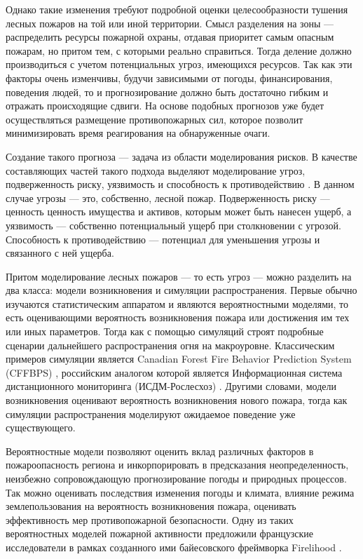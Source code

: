 \documentclass[a4paper,article,14pt]{extarticle}
\begin{document}
Однако такие изменения требуют подробной оценки целесообразности тушения лесных пожаров на той или иной территории. Смысл разделения на зоны — распределить ресурсы пожарной охраны, отдавая приоритет самым опасным пожарам, но притом тем, с которыми реально справиться. Тогда деление должно производиться с учетом потенциальных угроз, имеющихся ресурсов. Так как эти факторы очень изменчивы, будучи зависимыми от погоды, финансирования, поведения людей, то и прогнозирование должно быть достаточно гибким и отражать происходящие сдвиги. На основе подобных прогнозов уже будет осуществляться размещение противопожарных сил, которое позволит минимизировать время реагирования на обнаруженные очаги.

Создание такого прогноза — задача из области моделирования рисков. В качестве составляющих частей такого подхода выделяют моделирование угроз,  подверженность риску, уязвимость и способность к противодействию \cite{OliveiraWildfireRiskModeling2021}. В данном случае угрозы — это, собственно, лесной пожар. Подверженность риску — ценность ценность имущества и активов, которым может быть нанесен ущерб, а уязвимость — собственно потенциальный ущерб при столкновении с угрозой. Способность к противодействию — потенциал для уменьшения угрозы и связанного с ней ущерба.

Притом моделирование лесных пожаров — то есть угроз — можно разделить на два класса: модели возникновения и симуляции распространения. Первые обычно изучаются статистическим аппаратом и являются вероятностными моделями, то есть оценивающими вероятность возникновения пожара или достижения им тех или иных параметров. Тогда как с помощью симуляций строят подробные сценарии дальнейшего распространения огня на макроуровне. Классическим примеров симуляции является Canadian Forest Fire Behavior Prediction System (CFFBPS) \cite{CanadianForestFire}, российским аналогом которой является Информационная система дистанционного мониторинга (ИСДМ-Рослесхоз) \cite{RossiyskayaSistemaSputnikovogo2004}. Другими словами, модели возникновения оценивают вероятность возникновения нового пожара, тогда как симуляции распространения моделируют ожидаемое поведение уже существующего.

Вероятностные модели позволяют оценить вклад различных факторов в пожароопасность региона и инкорпорировать в предсказания неопределенность, неизбежно сопровождающую прогнозирование погоды и природных процессов. Так можно оценивать последствия изменения погоды и климата, влияние режима землепользования на вероятность возникновения пожара, оценивать эффективность мер противопожарной безопасности. Одну из таких вероятностных моделей пожарной активности предложили французские исследователи в рамках созданного ими байесовского фреймворка Firelihood \cite{PimontPredictionRegionalWildfire2021}.
\end{document}
